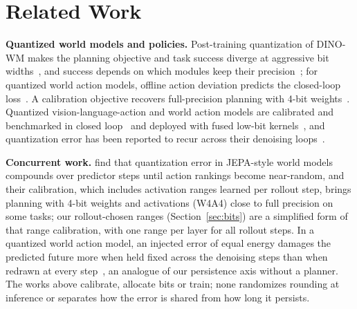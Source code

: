 \documentclass[10pt]{article}
\begin{document}
\section{Related Work}
\label{sec:related}

\textbf{Quantized world models and policies.} Post-training quantization of DINO-WM makes the planning objective and task success diverge at aggressive bit widths~\citep{fu2026wmquant}, and success depends on which modules keep their precision~\citep{ranganath2026bits}; for quantized world action models, offline action deviation predicts the closed-loop loss~\citep{xu2026prede}. A calibration objective recovers full-precision planning with 4-bit weights~\citep{anon2026modulemse}. Quantized vision-language-action and world action models are calibrated and benchmarked in closed loop~\citep{quantwams2026, vlaquantbench2026, qvla2026, park2026qcrl, loopq2026} and deployed with fused low-bit kernels~\citep{wang2026steerquant, anon2026loopquant}, and quantization error has been reported to recur across their denoising loops~\citep{anon2026loopquant}.

\textbf{Concurrent work.} \citet{wmquant2026} find that quantization error in JEPA-style world models compounds over predictor steps until action rankings become near-random, and their calibration, which includes activation ranges learned per rollout step, brings planning with 4-bit weights and activations (W4A4) close to full precision on some tasks; our rollout-chosen ranges (Section~\ref{sec:bits}) are a simplified form of that range calibration, with one range per layer for all rollout steps. In a quantized world action model, an injected error of equal energy damages the predicted future more when held fixed across the denoising steps than when redrawn at every step~\citep{laq2026}, an analogue of our persistence axis without a planner. The works above calibrate, allocate bits or train; none randomizes rounding at inference or separates how the error is shared from how long it persists.
\end{document}
